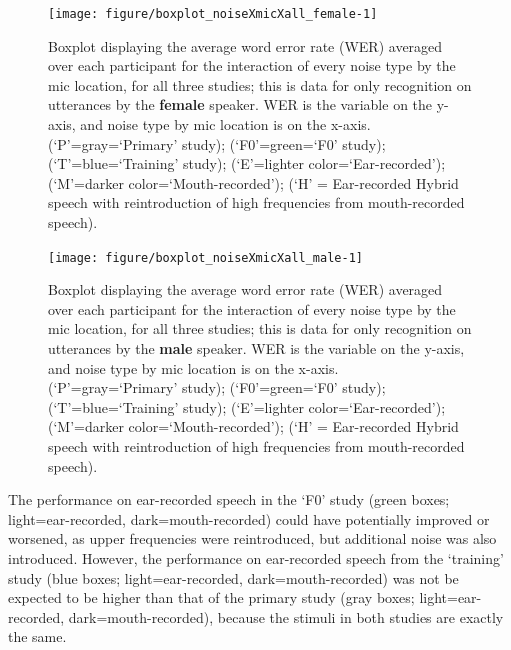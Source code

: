 \begin{figure}[h!]
\centering

\texttt{[image: figure/boxplot\_noiseXmicXall\_female-1]} 

\caption{Boxplot displaying the average word error rate (WER) averaged over each participant for the interaction of every noise type by the mic location, for all three studies; this is data for only recognition on utterances by the \textbf{female} speaker. WER is the variable on the y-axis, and noise type by mic location is on the x-axis. (`P'=gray=`Primary' study); (`F0'=green=`F0' study); (`T'=blue=`Training' study); (`E'=lighter color=`Ear-recorded'); (`M'=darker color=`Mouth-recorded'); (`H' = Ear-recorded Hybrid speech with reintroduction of high frequencies from mouth-recorded speech).}
\label{fig:female-all}
\end{figure}

\begin{figure}[h!]
\centering

\texttt{[image: figure/boxplot\_noiseXmicXall\_male-1]} 

\caption{Boxplot displaying the average word error rate (WER) averaged over each participant for the interaction of every noise type by the mic location, for all three studies; this is data for only recognition on utterances by the \textbf{male} speaker. WER is the variable on the y-axis, and noise type by mic location is on the x-axis. (`P'=gray=`Primary' study); (`F0'=green=`F0' study); (`T'=blue=`Training' study); (`E'=lighter color=`Ear-recorded'); (`M'=darker color=`Mouth-recorded'); (`H' = Ear-recorded Hybrid speech with reintroduction of high frequencies from mouth-recorded speech).}
\label{fig:male-all}
\end{figure}


The performance on ear-recorded speech in the `F0' study (green boxes; light=ear-recorded, dark=mouth-recorded) could have potentially improved or worsened, as upper frequencies were reintroduced, but additional noise was also introduced.  However, the performance on ear-recorded speech from the `training' study (blue boxes; light=ear-recorded, dark=mouth-recorded) was not be expected to be higher than that of the primary study (gray boxes; light=ear-recorded, dark=mouth-recorded), because the stimuli in both studies are exactly the same.  

